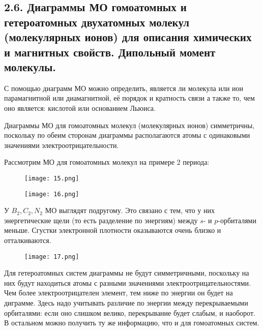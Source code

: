 



\subsection{2.6. Диаграммы МО гомоатомных и гетероатомных двухатомных молекул (молекулярных ионов) для описания химических и магнитных свойств. Дипольный момент молекулы.} 

\par\bigskip
	
	С помощью диаграмм МО можно определить, является ли
	молекула или ион парамагнитной или диамагнитной, её порядок и
	кратность связи а также то, чем оно является: кислотой или
	основанием Льюиса.
	
	\par\smallskip
	
	Диаграммы МО для гомоатомных молекул (молекулярных ионов)
	симметричны, поскольку по обеим сторонам диаграммы
	располагаются атомы с одинаковыми значениями
	электроотрицательности.
	
	\par\smallskip
	
	Рассмотрим МО для гомоатомных молекул на примере 2 периода:
	
	
	
	\begin{figure}[H]
		\centering
		{\texttt{[image: 15.png]}}
	\end{figure}


\begin{figure}[H]
	\centering
	{\texttt{[image: 16.png]}}
\end{figure}
	
	\par\smallskip
	
	У $B_2, C_2, N_2$ МО выглядят подругому. Это связано с тем, что у
	них энергетические щели (то есть
	разделение по энергиям) между $s$- и
	$p$-орбиталями меньше. Сгустки
	электронной плотности
	оказываются очень близко и
	отталкиваются.
	
	
	\begin{figure}[H]
		\centering
		{\texttt{[image: 17.png]}}
	\end{figure}
	
	\par\smallskip
	
	Для гетероатомных систем диаграммы не будут симметричными,
	поскольку на них будут находиться атомы с разными значениями
	электроотрицательностями. Чем более электроотрицателен
	элемент, тем ниже по энергии он будет на диграмме. Здесь надо
	учитывать различие по энергии между перекрываемыми
	орбиталями: если оно слишком велико, перекрывание будет
	слабым, и наоборот. В остальном можно получить ту же
	информацию, что и для гомоатомных систем.
	
